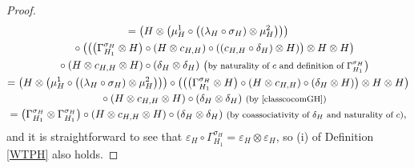 \documentclass[pdftex]{sigma}
\numberwithin{equation}{section}
\begin{document}
\begin{proof}
\begin{gather*}
 =\bigl(H\otimes\bigl(\mu_{H}^{1}\circ\bigl((\lambda_{H}\circ\sigma_{H})\otimes\mu_{H}^{2}\bigr)\bigr)\bigr)\\
 \quad{}\circ\bigl(\bigl(\bigl(\Gamma_{H_{1}}^{\sigma_{H}}\otimes H\bigr)\circ(H\otimes c_{H,H})\circ((c_{H,H}\circ\delta_{H})\otimes H)\bigr)\otimes H\otimes H\bigr)\\
 \quad{}\circ(H\otimes c_{H,H}\otimes H)\circ(\delta_{H}\otimes\delta_{H}) \ \text{\footnotesize\textnormal{\big(by naturality of $c$ and definition of $\Gamma_{H_{1}}^{\sigma_{H}}$\big)}} \\
 =\bigl(H\otimes\bigl(\mu_{H}^{1}\circ\bigl((\lambda_{H}\circ\sigma_{H})\otimes\mu_{H}^{2}\bigr)\bigr)\bigr)\circ\bigl(\bigl(\bigl(\Gamma_{H_{1}}^{\sigma_{H}}\otimes H\bigr)\circ(H\otimes c_{H,H})\circ(\delta_{H}\otimes H)\bigr)\otimes H\otimes H\bigr)\\
 \quad{}\circ(H\otimes c_{H,H}\otimes H)\circ(\delta_{H}\otimes\delta_{H}) \ \text{\footnotesize\textnormal{(by \eqref{classcocomGH})}}\\
 =\bigl(\Gamma_{H_{1}}^{\sigma_{H}}\otimes\Gamma_{H_{1}}^{\sigma_{H}}\bigr)\circ(H\otimes c_{H,H}\otimes H)\circ(\delta_{H}\otimes\delta_{H})\ \text{\footnotesize\textnormal{(by coassociativity of $\delta_{H}$ and naturality of $c$)}},
\end{gather*}
and it is straightforward to see that $\varepsilon_{H}\circ\Gamma_{H_{1}}^{\sigma_{H}}=\varepsilon_{H}\otimes\varepsilon_{H}$, so (i) of Definition \ref{WTPH} also holds.
\end{proof}
\end{document}
